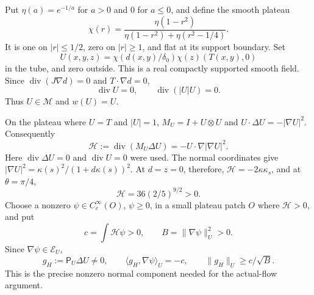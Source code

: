 \documentclass[11pt,a4paper]{article}
\theoremstyle{definition}\newtheorem{definition}[theorem]{Definition}
\theoremstyle{remark}\newtheorem{remark}[theorem]{Remark}
\newcommand{\M}{\mathcal M}
\newcommand{\GG}{\mathcal E}
\newcommand{\GP}{\mathsf P}
\newcommand{\norm}[1]{\lVert #1\rVert}
\newcommand{\ip}[2]{\langle #1,#2\rangle}
\newcommand{\diver}{\operatorname{div}}
\numberwithin{equation}{section}
\begin{document}
Put $\eta(a)=e^{-1/a}$ for $a>0$ and $0$ for $a\le0$, and define the smooth plateau
\[
 \chi(r)=\frac{\eta(1-r^2)}{\eta(1-r^2)+\eta(r^2-1/4)}.
\]
It is one on $|r|\le1/2$, zero on $|r|\ge1$, and flat at its support boundary. Set
\begin{equation}\label{eq:ellipsefield}
 U(x,y,z)=\chi(d(x,y)/\delta_0)\chi(z)(T(x,y),0)
\end{equation}
in the tube, and zero outside. This is a real compactly supported smooth field. Since $\diver(J\nabla d)=0$ and $T\cdot\nabla d=0$,
\[
 \diver U=0,\qquad \diver(|U|U)=0.
\]
Thus $U\in\M$ and $w(U)=U$.

On the plateau where $U=T$ and $|U|=1$, $M_U=I+U\otimes U$ and $U\cdot\Delta U=-|\nabla U|^2$. Consequently
\begin{equation}\label{eq:heatnormal}
 \mathscr H:=\diver(M_U\Delta U)
 =-U\cdot\nabla|\nabla U|^2.
\end{equation}
Here $\diver\Delta U=0$ and $\diver U=0$ were used. The normal coordinates give
$|\nabla U|^2=\kappa(s)^2/(1+d\kappa(s))^2$.
At $d=z=0$, therefore, $\mathscr H=-2\kappa\kappa_s$, and at $\theta=\pi/4$,
\begin{equation}\label{eq:Hpositive}
 \mathscr H=36(2/5)^{9/2}>0.
\end{equation}
Choose a nonzero $\psi\in C_c^\infty(O)$, $\psi\ge0$, in a small plateau patch $O$ where $\mathscr H>0$, and put
\begin{equation}\label{eq:cB}
 c=\int\mathscr H\psi>0,
 \qquad B=\norm{\nabla\psi}_U^2>0.
\end{equation}
Since $\nabla\psi\in\GG_U$,
\begin{equation}\label{eq:gH}
 g_H:=\GP_U\Delta U\ne0,
 \qquad \ip{g_H}{\nabla\psi}_U=-c,
 \qquad \norm{g_H}_U\ge c/\sqrt B.
\end{equation}
This is the precise nonzero normal component needed for the actual-flow argument.
\end{document}

